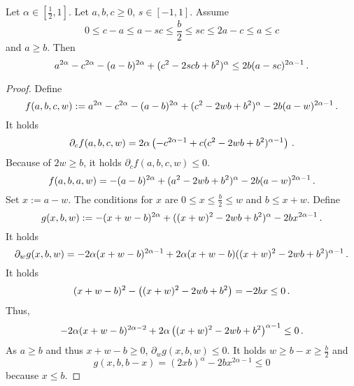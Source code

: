 %
\begin{lemma}\label{lmm:bgeqascandageqb}
	Let $\alpha\in[\frac12,1]$.
	Let $a,b,c\geq0$, $s\in[-1,1]$.
	Assume 
	\begin{equation*}
		0 \leq c - a \leq a -sc \leq \frac b2 \leq sc \leq 2a-c \leq a \leq c
	\end{equation*}
	and
	$a \geq b$.
	Then
	\begin{equation*}
		a^{2\alpha}-c^{2\alpha}-(a-b)^{2\alpha}+(c^2 - 2 s c b + b^2)^\alpha 
		\leq 
		2 b (a-sc)^{2\alpha-1}
		\, .
	\end{equation*}
\end{lemma}
%
\begin{proof}
	Define
	\begin{equation*}
		f(a,b,c,w) := a^{2\alpha}-c^{2\alpha}-(a-b)^{2\alpha}+(c^2 - 2 w b + b^2)^\alpha 
			- 2 b (a-w)^{2\alpha-1}
			\, .
	\end{equation*} 
	It holds
	\begin{equation*}
		\partial_c f(a,b,c,w) =2\alpha\left( -c^{2\alpha-1}+c(c^2 - 2 w b + b^2)^{\alpha-1} \right)
		\, .
	\end{equation*} 
	Because of $2w \geq b$, it holds $\partial_c f(a,b,c,w) \leq 0$.
	\begin{equation*}
		f(a,b,a,w) = -(a-b)^{2\alpha}+(a^2 - 2 w b + b^2)^\alpha - 2 b (a-w)^{2\alpha-1}
		\, .
	\end{equation*}
	Set $x := a-w$.
	The conditions for $x$ are $0 \leq x \leq \frac b2 \leq w$ and $b \leq x+w$. Define
	\begin{equation*}
		g(x,b,w) := -(x+w-b)^{2\alpha}+((x+w)^2 - 2 w b + b^2)^\alpha - 2 b x^{2\alpha-1}
		\, .
	\end{equation*}
	It holds
	\begin{equation*}
		\partial_w g(x,b,w) =-2\alpha(x+w-b)^{2\alpha-1}+2\alpha(x+w-b)((x+w)^2 - 2 w b + b^2)^{\alpha-1} 
		\, .
	\end{equation*}
	It holds
	\begin{equation*}
		(x+w-b)^2 - \left( (x+w)^2 - 2 w b + b^2 \right) = -2 b x \leq 0
		\, .
	\end{equation*}
	Thus,
	\begin{equation*}
		-2\alpha(x+w-b)^{2\alpha-2} + 2\alpha\left( (x+w)^2 - 2 w b + b^2 \right)^{\alpha-1} \leq 0
		\, .
	\end{equation*}
	As $a \geq b$ and thus $x+w-b \geq 0$, $\partial_w g(x,b,w) \leq 0$.
	It holds $w \geq b-x \geq \frac b2$ and 
	\begin{equation*}
		g(x,b,b-x)
		=
		(2 x b)^\alpha - 2 b x^{2\alpha-1}
		\leq 0
	\end{equation*}
	because $x\leq b$.
\end{proof}
%
%
%
%
